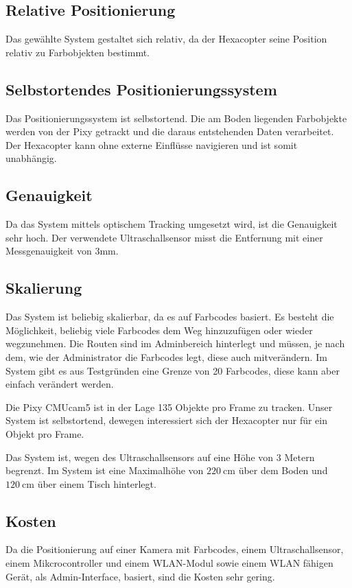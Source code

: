   \subsection*{Relative Positionierung}
  Das gewählte System gestaltet sich relativ, da der Hexacopter seine Position relativ zu Farbobjekten bestimmt.

  \subsection*{Selbstortendes Positionierungssystem}
  Das Positionierungssystem ist selbstortend. Die am Boden liegenden Farbobjekte werden von der Pixy getrackt und die daraus entstehenden Daten verarbeitet. Der Hexacopter kann ohne externe Einflüsse navigieren und ist somit unabhängig.

  \subsection*{Genauigkeit}
  Da das System mittels optischem Tracking umgesetzt wird, ist die Genauigkeit sehr hoch.
  Der verwendete Ultraschallsensor misst die Entfernung mit einer Messgenauigkeit von 3mm.

  \subsection*{Skalierung}
  Das System ist beliebig skalierbar, da es auf Farbcodes basiert. Es besteht die Möglichkeit, beliebig viele Farbcodes dem Weg hinzuzufügen oder wieder wegzunehmen. Die Routen sind im Adminbereich hinterlegt und müssen, je nach dem, wie der Administrator die Farbcodes legt, diese auch mitverändern. Im System gibt es aus Testgründen eine Grenze von 20 Farbcodes, diese kann aber einfach verändert werden.

  Die Pixy CMUcam5 ist in der Lage 135 Objekte pro Frame zu tracken. Unser System ist selbstortend, dewegen interessiert sich der Hexacopter nur für ein Objekt pro Frame. \cite{PIXY_Porting_Examplecode}

  Das System ist, wegen des Ultraschallsensors auf eine Höhe von 3 Metern begrenzt. Im System ist eine Maximalhöhe von $\SI{220}{\centi\metre}$ über dem Boden und $\SI{120}{\centi\metre}$ über einem Tisch hinterlegt.

  \subsection*{Kosten}
  Da  die Positionierung auf einer Kamera mit Farbcodes, einem Ultraschallsensor, einem Mikcrocontroller und einem WLAN-Modul sowie einem WLAN fähigen Gerät, als Admin-Interface, basiert, sind die Kosten sehr gering.

